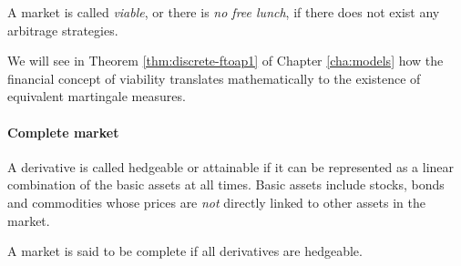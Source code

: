 %


\begin{dfn}
	A market is called \emph{viable}, or there is \emph{no free lunch}, if there does not exist any arbitrage strategies.
\end{dfn}

We will see in Theorem \ref{thm:discrete-ftoap1} of Chapter \ref{cha:models} how the financial concept of viability translates mathematically to the existence of equivalent martingale measures.


\paragraph{Complete market}

\begin{dfn}
	A derivative is called hedgeable or attainable if it can be represented as a linear combination of the basic assets at all times. Basic assets include stocks, bonds and commodities whose prices are \emph{not} directly linked to other assets in the market.
\end{dfn}

\begin{dfn}
	A market is said to be complete if all derivatives are hedgeable.
\end{dfn}

